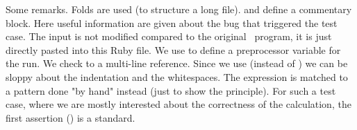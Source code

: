 Some remarks. Folds are used (to structure a long file).  and 
define a commentary block. Here useful information are given about the bug that
triggered the test case. The input is not modified compared to the original
\FORM\ program, it is just directly pasted into this Ruby file. We use
 to define a preprocessor variable for the run. We check
 to a multi-line reference. Since we use  (instead of
) we can be sloppy about the indentation and the whitespaces.
The expression  is matched to a pattern done "by hand" instead (just to
show the principle). For such a test case, where we are mostly interested about
the correctness of the calculation, the first assertion ()
is a standard.

